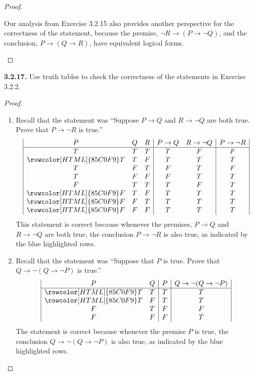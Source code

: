 \documentclass[12pt]{amsart}
\newenvironment{statement}[1]{\smallskip\noindent\color[rgb]{.6627, .3529, .6314} {\bf #1.}}{}
\theoremstyle{definition}
\theoremstyle{remark}
\begin{document}
\begin{proof}
\begin{enumerate}
	Our analysis from Exercise 3.2.15 also provides another perspective for the correctness
	of the statement, because the premise, $\neg R \rightarrow (P \rightarrow \neg Q)$,
	and the conclusion, $P \rightarrow (Q \rightarrow R)$, have equivalent logical forms.
\end{enumerate}
\end{proof}


\begin{statement}{3.2.17}
Use truth tables to check the correctness of the statements in Exercise 3.2.2.
\end{statement}

\begin{proof}
\hfill
\begin{enumerate}
	\item Recall that the statement was
	``Suppose $P \rightarrow Q$ and $R \rightarrow \neg Q$ are both true.
	Prove that $P \rightarrow \neg R$ is true.''
	\begin{equation*}
		\begin{array}{| c c c | c  c | c |}
		P & Q & R & P \rightarrow Q &  R \rightarrow \neg Q & P \rightarrow \neg R\\
		\hline
		T & T & T & T & F & F \\
		\rowcolor[HTML]{85C0F9} T & T & F & T & T & T \\
		T & F & T & F & T & F \\
		T & F & F & F & T & T \\
		F & T & T & T & F & T \\
		\rowcolor[HTML]{85C0F9} F & T & F & T & T & T \\
		\rowcolor[HTML]{85C0F9} F & F & T & T & T & T \\
		\rowcolor[HTML]{85C0F9} F & F & F & T & T & T \\
		\end{array}
	\end{equation*}
	This statement is correct because whenever the premises, $P \rightarrow Q$ and
	$R \rightarrow \neg Q$ are both true, the conclusion $P \rightarrow \neg R$ is also true,
	as indicated by the blue highlighted rows.
	
	\item Recall that the statement was 
	``Suppose that $P$ is true.
	Prove that $Q \rightarrow \neg (Q \rightarrow \neg P)$ is true.''
	\begin{equation*}
		\begin{array}{| c c | c | c |}
			P & Q & P & Q \rightarrow \neg (Q \rightarrow \neg P)\\
			\hline
			\rowcolor[HTML]{85C0F9} T & T & T & T \\
			\rowcolor[HTML]{85C0F9} T & F & T & T \\
			F & T & F & F \\
			F & F & F & T
		\end{array}
	\end{equation*}
	The statement is correct because whenever the premise $P$ is true, the conclusion
	$Q \rightarrow \neg (Q \rightarrow \neg P)$ is also true, as indicated by the blue
	highlighted rows.
	

\end{enumerate}
\end{proof}
\end{document}
